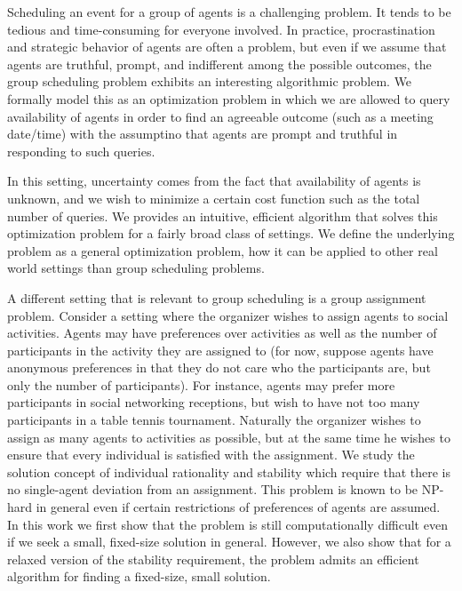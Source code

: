 Scheduling an event for a group of agents is a challenging problem. 
It tends to be tedious and time-consuming for everyone involved.
In practice, procrastination and strategic behavior of agents are often a problem, but even if we assume that agents are truthful, prompt, and indifferent among the possible outcomes, the group scheduling problem exhibits an interesting algorithmic problem. 
We formally model this as an optimization problem in which we are allowed to query availability of agents in order to find an agreeable outcome (such as a meeting date/time) with the assumptino that agents are prompt and truthful in responding to such queries. 

In this setting, uncertainty comes from the fact that availability of agents is unknown, and we wish to minimize a certain cost function such as the total number of queries. We provides an intuitive, efficient algorithm that solves this optimization problem for a fairly broad class of settings. We define the underlying problem as a general optimization problem, how it can be applied to other real world settings than group scheduling problems.

A different setting that is relevant to group scheduling is a group assignment problem. Consider a setting where the organizer wishes to assign agents to social activities. Agents may have preferences over activities as well as the number of participants in the activity they are assigned to (for now, suppose agents have anonymous preferences in that they do not care who the participants are, but only the number of participants). For instance, agents may prefer more participants in social networking receptions, but wish to have not too many participants in a table tennis tournament. Naturally the organizer wishes to assign as many agents to activities as possible, but at the same time he wishes to ensure that every individual is satisfied with the assignment. We study the solution concept of individual rationality and stability which require that there is no single-agent deviation from an assignment. This problem is known to be NP-hard in general even if certain restrictions of preferences of agents are assumed. In this work we first show that the problem is still computationally difficult even if we seek a small, fixed-size solution in general. However, we also show that for a relaxed version of the stability requirement, the problem admits an efficient algorithm for finding a fixed-size, small solution. 

